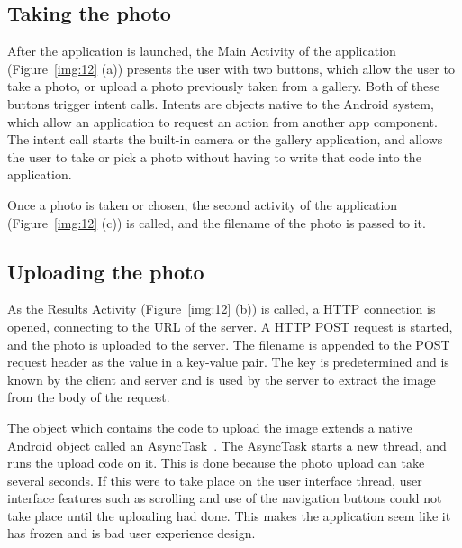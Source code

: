 \documentclass[11pt, a4paper]{report}
\begin{document}
\subsection{Taking the photo}

After the application is launched, the Main Activity of the application (Figure~\ref{img:12} (a)) presents the user with two buttons, which allow the user to take a photo, or upload a photo previously taken from a gallery. Both of these buttons trigger intent calls. Intents are objects native to the Android system, which allow an application to request an action from another app component. The intent call starts the built-in camera or the gallery application, and allows the user to take or pick a photo without having to write that code into the application. 

Once a photo is taken or chosen, the second activity of the application (Figure~\ref{img:12} (c)) is called, and the filename of the photo is passed to it. 


\subsection{Uploading the photo}

As the Results Activity (Figure~\ref{img:12} (b)) is called, a HTTP connection is opened, connecting to the URL of the server. A HTTP POST request is started, and the photo is uploaded to the server. The filename is appended to the POST request header as the value in a key-value pair. The key is predetermined and is known by the client and server and is used by the server to extract the image from the body of the request. 

The object which contains the code to upload the image extends a native Android object called an AsyncTask~\cite{AndroidDev:AsyncTask}. The AsyncTask starts a new thread, and runs the upload code on it. This is done because the photo upload can take several seconds. If this were to take place on the user interface thread, user interface features such as scrolling and use of the navigation buttons could not take place until the uploading had done. This makes the application seem like it has frozen and is bad user experience design.
\end{document}
